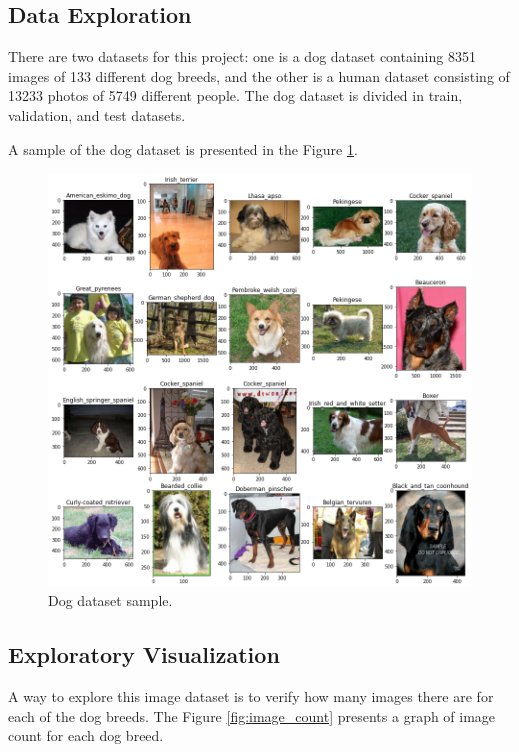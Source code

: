 \documentclass{article}
\begin{document}
    \subsection{Data Exploration}

    There are two datasets for this project: one is a dog dataset containing 8351 images of 133 different dog breeds, and the other is a human dataset consisting of 13233 photos of 5749 different people. The dog dataset is divided in train, validation, and test datasets.

    A sample of the dog dataset is presented in the Figure \ref*{fig:dog_sample}.

    \begin{figure}[htbp]
        \centering
        \includegraphics[width=\linewidth]{img/sample.png}
        \caption{Dog dataset sample.}
        \label{fig:dog_sample}
    \end{figure}

    \subsection{Exploratory Visualization}

    A way to explore this image dataset is to verify how many images there are for each of the dog breeds. The Figure \ref*{fig:image_count} presents a graph of image count for each dog breed.
\end{document}

